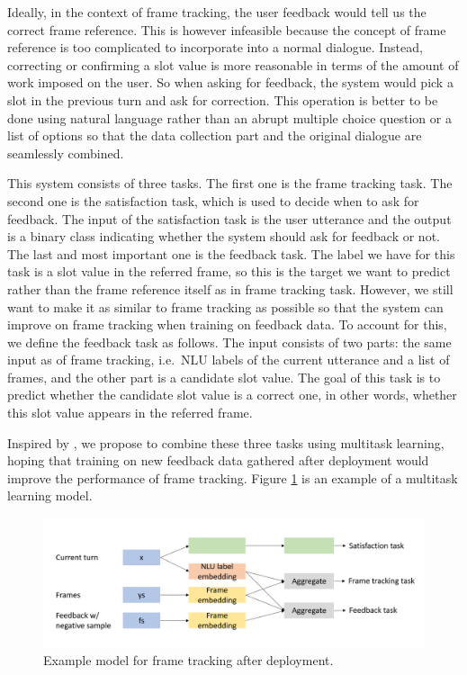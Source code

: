 
Ideally, in the context of frame tracking, the user feedback would tell us the correct frame reference. This is however infeasible because the concept of frame reference is too complicated to incorporate into a normal dialogue. Instead, correcting or confirming a slot value is more reasonable in terms of the amount of work imposed on the user. So when asking for feedback, the system would pick a slot in the previous turn and ask for correction. This operation is better to be done using natural language rather than an abrupt multiple choice question or a list of options so that the data collection part and the original dialogue are seamlessly combined.

This system consists of three tasks. The first one is the frame tracking task.
The second one is the satisfaction task, which is used to decide when to ask for feedback. The input of the satisfaction task is the user utterance and the output is a binary class indicating whether the system should ask for feedback or not.
The last and most important one is the feedback task. The label we have for this task is a slot value in the referred frame, so this is the target we want to predict rather than the frame reference itself as in frame tracking task. However, we still want to make it as similar to frame tracking as possible so that the system can improve on frame tracking when training on feedback data. To account for this, we define the feedback task as follows. The input consists of two parts: the same input as of frame tracking, i.e.\ NLU labels of the current utterance and a list of frames, and the other part is a candidate slot value. The goal of this task is to predict whether the candidate slot value is a correct one, in other words, whether this slot value appears in the referred frame.

Inspired by \cite{hancock2019learning}, we propose to combine these three tasks using multitask learning, hoping that training on new feedback data gathered after deployment would improve the performance of frame tracking. Figure \ref{fig:multitask} is an example of a multitask learning model.

\begin{figure}
    \centering
    \includegraphics[width=\columnwidth]{figures/multitask2.png}
    \caption[An example of frame tracking after deployment]{Example model for frame tracking after deployment.}
    \label{fig:multitask}
\end{figure}

